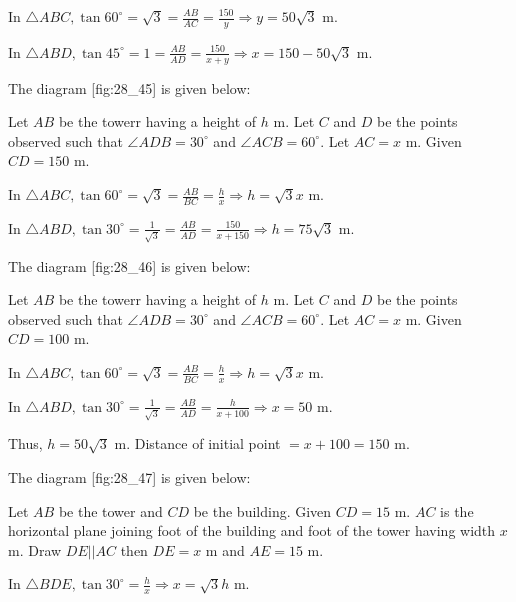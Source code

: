   In $\triangle ABC, \tan60^\circ = \sqrt{3} = \frac{AB}{AC} = \frac{150}{y} \Rightarrow y = 50\sqrt{3}$ m.

  In $\triangle ABD, \tan45^\circ = 1 = \frac{AB}{AD} = \frac{150}{x + y}\Rightarrow x = 150 - 50\sqrt{3}$ m.

\item The diagram [fig:28_45] is given below:

  \startplacefigure[reference=fig:28_45]
    \externalfigure[28_45.pdf]
  \stopplacefigure

  Let $AB$ be the towerr having a height of $h$ m. Let $C$ and $D$ be the points observed such that
  $\angle ADB = 30^\circ$ and $\angle ACB = 60^\circ$. Let $AC = x$ m. Given $CD = 150$ m.

  In $\triangle ABC, \tan60^\circ = \sqrt{3} = \frac{AB}{BC} = \frac{h}{x} \Rightarrow h = \sqrt{3}x$ m.

  In $\triangle ABD, \tan30^\circ = \frac{1}{\sqrt{3}} = \frac{AB}{AD} = \frac{150}{x + 150} \Rightarrow h = 75\sqrt{3}$ m.

\item The diagram [fig:28_46] is given below:

  \startplacefigure[reference=fig:28_46]
    \externalfigure[28_46.pdf]
  \stopplacefigure

  Let $AB$ be the towerr having a height of $h$ m. Let $C$ and $D$ be the points observed such that
  $\angle ADB = 30^\circ$ and $\angle ACB = 60^\circ$. Let $AC = x$ m. Given $CD = 100$ m.

  In $\triangle ABC, \tan60^\circ = \sqrt{3} = \frac{AB}{BC} = \frac{h}{x} \Rightarrow h = \sqrt{3}x$ m.

  In $\triangle ABD, \tan30^\circ = \frac{1}{\sqrt{3}} = \frac{AB}{AD} = \frac{h}{x + 100} \Rightarrow x = 50$ m.

  Thus, $h = 50\sqrt{3}$ m. Distance of initial point $= x + 100 = 150$ m.

\item The diagram [fig:28_47] is given below:

  \startplacefigure[reference=fig:28_47]
    \externalfigure[28_47.pdf]
  \stopplacefigure

  Let $AB$ be the tower and $CD$ be the building. Given $CD = 15$ m. $AC$ is the horizontal plane joining
  foot of the building and foot of the tower having width $x$ m. Draw $DE||AC$ then $DE = x$ m and $AE =
  15$ m.

  In $\triangle BDE, \tan30^\circ = \frac{h}{x}\Rightarrow x = \sqrt{3}h$ m.

